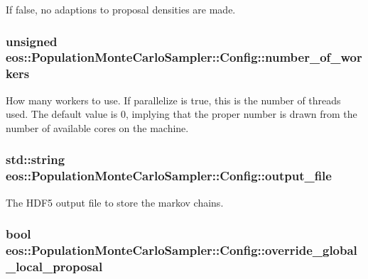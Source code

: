 If false, no adaptions to proposal densities are made. \hypertarget{structeos_1_1PopulationMonteCarloSampler_1_1Config_ae6362a7374c9ca1650b501c07672442a}{
\subsubsection[{number\_\-of\_\-workers}]{\setlength{\rightskip}{0pt plus 5cm}unsigned {\bf eos::PopulationMonteCarloSampler::Config::number\_\-of\_\-workers}}}
\label{structeos_1_1PopulationMonteCarloSampler_1_1Config_ae6362a7374c9ca1650b501c07672442a}
How many workers to use. If parallelize is true, this is the number of threads used. The default value is 0, implying that the proper number is drawn from the number of available cores on the machine. \hypertarget{structeos_1_1PopulationMonteCarloSampler_1_1Config_abe31836405a05391987afe00f1f231d3}{
\subsubsection[{output\_\-file}]{\setlength{\rightskip}{0pt plus 5cm}std::string {\bf eos::PopulationMonteCarloSampler::Config::output\_\-file}}}
\label{structeos_1_1PopulationMonteCarloSampler_1_1Config_abe31836405a05391987afe00f1f231d3}
The HDF5 output file to store the markov chains. \hypertarget{structeos_1_1PopulationMonteCarloSampler_1_1Config_aee29a36e8e23c971ba1e36616e9affb4}{
\subsubsection[{override\_\-global\_\-local\_\-proposal}]{\setlength{\rightskip}{0pt plus 5cm}bool {\bf eos::PopulationMonteCarloSampler::Config::override\_\-global\_\-local\_\-proposal}}}
